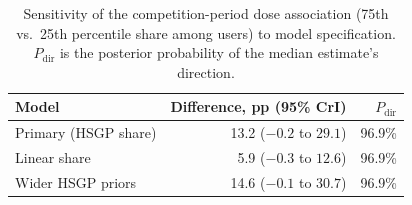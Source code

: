 \begin{table}[htbp]
\centering
\caption{Sensitivity of the competition-period dose association (75th vs.\ 25th percentile share among users) to model specification. $P_{\mathrm{dir}}$ is the posterior probability of the median estimate's direction.}
\label{tab:sensitivity}
\begin{tabular}{lrr}
\toprule
Model & Difference, pp (95\% CrI) & $P_{\mathrm{dir}}$ \\
\midrule
Primary (HSGP share) & 13.2 ($-0.2$ to $29.1$) & 96.9\% \\
Linear share & 5.9 ($-0.3$ to $12.6$) & 96.9\% \\
Wider HSGP priors & 14.6 ($-0.1$ to $30.7$) & 96.9\% \\
\bottomrule
\end{tabular}
\end{table}
